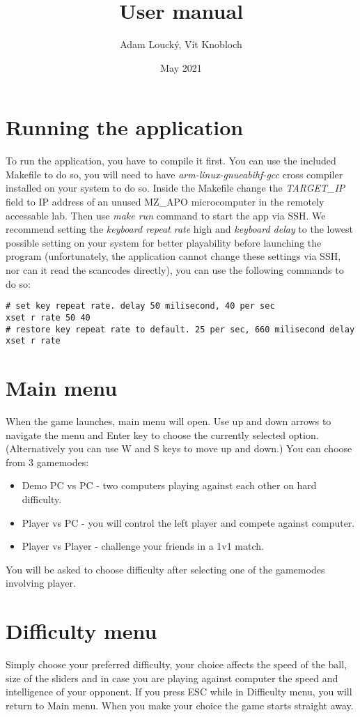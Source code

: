 \documentclass{article}
\title{User manual}
\author{Adam Loucký, Vít Knobloch}
\date{May 2021}
\begin{document}
\maketitle

\section{Running the application}
To run the application, you have to compile it first. You can use the included Makefile to do so, you will need to have \textit{arm-linux-gnueabihf-gcc} cross compiler installed on your system to do so. Inside the Makefile change the \textit{TARGET\_IP} field to IP address of an unused MZ\_APO microcomputer in the remotely accessable lab. Then use \textit{make run} command to start the app via SSH. We recommend setting the \textit{keyboard repeat rate} high and \textit{keyboard delay} to the lowest possible setting on your system for better playability before launching the program (unfortunately, the application cannot change these settings via SSH, nor can it read the scancodes directly), you can use the following commands to do so:
\begin{verbatim}
# set key repeat rate. delay 50 milisecond, 40 per sec
xset r rate 50 40
# restore key repeat rate to default. 25 per sec, 660 milisecond delay
xset r rate
\end{verbatim}

\section{Main menu}
When the game launches, main menu will open. Use up and down arrows to navigate the menu and Enter key to choose the currently selected option. (Alternatively you can use W and S keys to move up and down.) You can choose from 3 gamemodes:
\begin{itemize}
    \item Demo PC vs PC - two computers playing against each other on hard difficulty.
    \item Player vs PC - you will control the left player and compete against computer.
    \item Player vs Player - challenge your friends in a 1v1 match.
\end{itemize}
You will be asked to choose difficulty after selecting one of the gamemodes involving player.

\section{Difficulty menu}
Simply choose your preferred difficulty, your choice affects the speed of the ball, size of the sliders and in case you are playing against computer the speed and intelligence of your opponent. If you press ESC while in Difficulty menu, you will return to Main menu. When you make your choice the game starts straight away.
\end{document}
